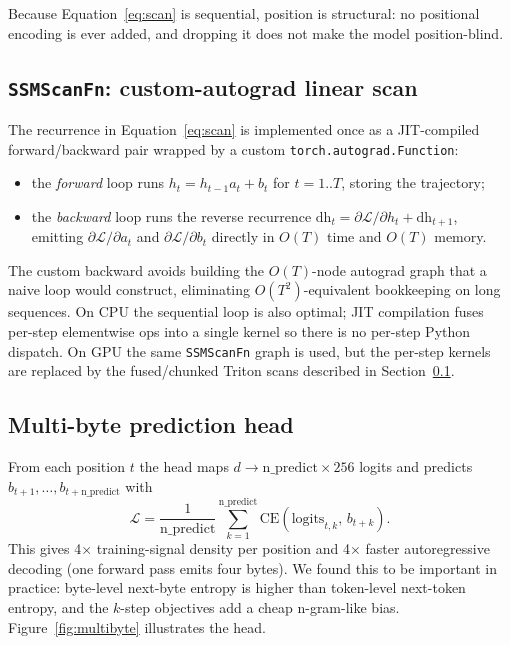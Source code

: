 \documentclass[11pt]{article}
\newcommand{\loss}{\mathcal{L}}
\begin{document}
Because Equation~\eqref{eq:scan} is sequential, position is structural: no
positional encoding is ever added, and dropping it does not make the model
position-blind.

\subsection{\texttt{SSMScanFn}: custom-autograd linear scan}
\label{sec:triton}
The recurrence in Equation~\eqref{eq:scan} is implemented once as a
JIT-compiled forward/backward pair wrapped by a custom
\texttt{torch.autograd.Function}:
\begin{itemize}
  \item the \emph{forward} loop runs $h_t=h_{t-1}a_t+b_t$ for $t=1..T$, storing
        the trajectory;
  \item the \emph{backward} loop runs the reverse recurrence
        $\mathrm{dh}_t=\partial\loss/\partial h_t+\mathrm{dh}_{t+1}$, emitting
        $\partial\loss/\partial a_t$ and $\partial\loss/\partial b_t$ directly
        in $O(T)$ time and $O(T)$ memory.
\end{itemize}
The custom backward avoids building the $O(T)$-node autograd graph that a
naive loop would construct, eliminating $O(T^2)$-equivalent bookkeeping on long
sequences. On CPU the sequential loop is also optimal; JIT compilation fuses
per-step elementwise ops into a single kernel so there is no per-step Python
dispatch. On GPU the same \texttt{SSMScanFn} graph is used, but the per-step
kernels are replaced by the fused/chunked Triton scans described in
Section~\ref{sec:triton}.

\subsection{Multi-byte prediction head}
From each position $t$ the head maps $d\to\mathrm{n\_predict}\times256$ logits
and predicts $b_{t+1},\dots,b_{t+\mathrm{n\_predict}}$ with
\begin{equation}
\loss=\frac{1}{\mathrm{n\_predict}}\sum_{k=1}^{\mathrm{n\_predict}}
\text{CE}(\text{logits}_{t,k},\,b_{t+k}).
\label{eq:loss}
\end{equation}
This gives 4$\times$ training-signal density per position and 4$\times$ faster
autoregressive decoding (one forward pass emits four bytes). We found this to be
important in practice: byte-level next-byte entropy is higher than token-level
next-token entropy, and the $k$-step objectives add a cheap n-gram-like bias.
Figure~\ref{fig:multibyte} illustrates the head.
\end{document}
